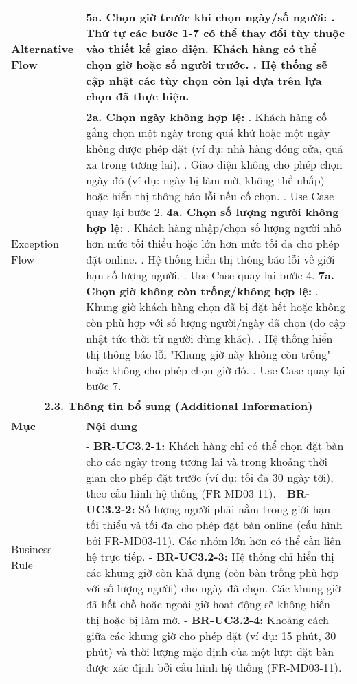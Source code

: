 \begin{longtable}{|m{4cm}|p{11cm}|}
\hline
Alternative Flow & \textbf{5a. Chọn giờ trước khi chọn ngày/số người:} \newline    1. Thứ tự các bước 1-7 có thể thay đổi tùy thuộc vào thiết kế giao diện. Khách hàng có thể chọn giờ hoặc số người trước. \newline    2. Hệ thống sẽ cập nhật các tùy chọn còn lại dựa trên lựa chọn đã thực hiện. \\
\hline
Exception Flow & \textbf{2a. Chọn ngày không hợp lệ:} \newline    1. Khách hàng cố gắng chọn một ngày trong quá khứ hoặc một ngày không được phép đặt (ví dụ: nhà hàng đóng cửa, quá xa trong tương lai). \newline    2. Giao diện không cho phép chọn ngày đó (ví dụ: ngày bị làm mờ, không thể nhấp) hoặc hiển thị thông báo lỗi nếu cố chọn. \newline    3. Use Case quay lại bước 2. \newline \textbf{4a. Chọn số lượng người không hợp lệ:} \newline    1. Khách hàng nhập/chọn số lượng người nhỏ hơn mức tối thiểu hoặc lớn hơn mức tối đa cho phép đặt online. \newline    2. Hệ thống hiển thị thông báo lỗi về giới hạn số lượng người. \newline    3. Use Case quay lại bước 4. \newline \textbf{7a. Chọn giờ không còn trống/không hợp lệ:} \newline    1. Khung giờ khách hàng chọn đã bị đặt hết hoặc không còn phù hợp với số lượng người/ngày đã chọn (do cập nhật tức thời từ người dùng khác). \newline    2. Hệ thống hiển thị thông báo lỗi "Khung giờ này không còn trống" hoặc không cho phép chọn giờ đó. \newline    3. Use Case quay lại bước 7. \\
\hline
\multicolumn{2}{|c|}{\textbf{2.3. Thông tin bổ sung (Additional Information)}} \\
\hline
\textbf{Mục} & \textbf{Nội dung} \\
\hline
Business Rule & - \textbf{BR-UC3.2-1:} Khách hàng chỉ có thể chọn đặt bàn cho các ngày trong tương lai và trong khoảng thời gian cho phép đặt trước (ví dụ: tối đa 30 ngày tới), theo cấu hình hệ thống (FR-MD03-11). \newline - \textbf{BR-UC3.2-2:} Số lượng người phải nằm trong giới hạn tối thiểu và tối đa cho phép đặt bàn online (cấu hình bởi FR-MD03-11). Các nhóm lớn hơn có thể cần liên hệ trực tiếp. \newline - \textbf{BR-UC3.2-3:} Hệ thống chỉ hiển thị các khung giờ còn khả dụng (còn bàn trống phù hợp với số lượng người) cho ngày đã chọn. Các khung giờ đã hết chỗ hoặc ngoài giờ hoạt động sẽ không hiển thị hoặc bị làm mờ. \newline - \textbf{BR-UC3.2-4:} Khoảng cách giữa các khung giờ cho phép đặt (ví dụ: 15 phút, 30 phút) và thời lượng mặc định của một lượt đặt bàn được xác định bởi cấu hình hệ thống (FR-MD03-11). \\

\end{longtable}
